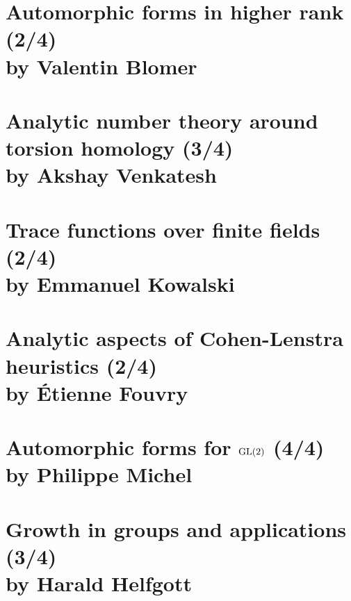 \documentclass[12pt,amsfont]{amsart}
\begin{document}
\newpage
\renewcommand{\thesubsection}{\arabic{section}.\arabic{subsection}}
\section{Automorphic forms in higher rank (2/4)
\\ by Valentin Blomer}\label{27}


\newpage
\renewcommand{\thesubsection}{\arabic{section}.\arabic{subsection}}
\section{Analytic number theory around torsion homology (3/4) \\by Akshay Venkatesh}\label{28}

\newpage
\renewcommand{\thesubsection}{\arabic{section}.\arabic{subsection}}
\section{Trace functions over finite fields
 (2/4)\\ by Emmanuel Kowalski}\label{29}

\newpage
\renewcommand{\thesubsection}{\arabic{section}.\arabic{subsection}}
\section{Analytic aspects of Cohen-Lenstra heuristics (2/4)
\\ by \'{E}tienne Fouvry}\label{30}

\newpage
\section{Automorphic forms for $\operatorname{GL}(2)$ (4/4)\\ by Philippe Michel}\label{1}

\begingroup
\renewcommand{\addcontentsline}[3]{}%
\endgroup


\newpage
\renewcommand{\thesubsection}{\arabic{section}.\arabic{subsection}}
\section{Growth in groups and applications (3/4)
\\ by Harald Helfgott}\label{2}


\newpage
\renewcommand{\thesubsection}{\arabic{section}.\arabic{subsection}}
\end{document}
